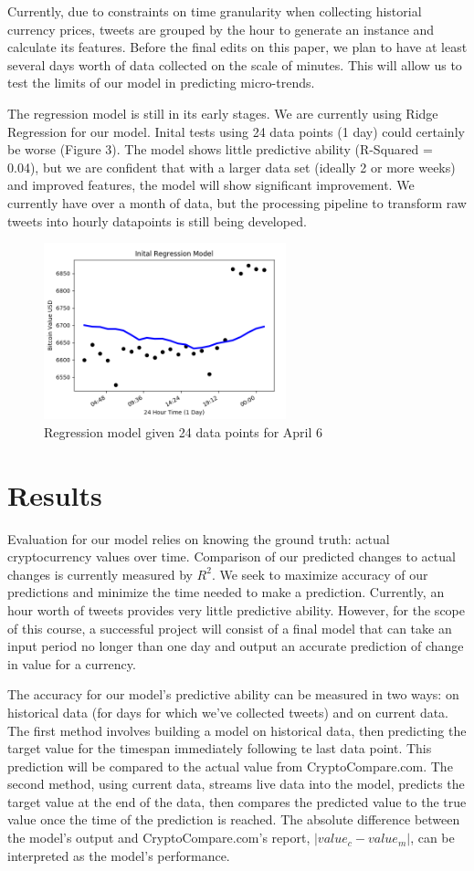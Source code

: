\documentclass[sigconf]{acmart}
\begin{document}
Currently, due to constraints on time granularity when collecting historial currency prices, tweets are grouped by the hour to generate an instance and calculate its features. Before the final edits on this paper, we plan to have at least several days worth of data collected on the scale of minutes. This will allow us to test the limits of our model in predicting micro-trends.

The regression model is still in its early stages. We are currently using Ridge Regression for our model. Inital tests using 24 data points (1 day) could certainly be worse (Figure 3). The model shows little predictive ability (R-Squared = 0.04), but we are confident that with a larger data set (ideally 2 or more weeks) and improved features, the model will show significant improvement. We currently have over a month of data, but the processing pipeline to transform raw tweets into hourly datapoints is still being developed.

\begin{figure}[H]
\caption{Regression model given 24 data points for April 6}
\includegraphics[width=7cm]{regression.png}
\end{figure}


\section{Results}
Evaluation for our model relies on knowing the ground truth: actual cryptocurrency values over time. Comparison of our predicted changes to actual changes is currently measured by $R^2$. We seek to maximize accuracy of our predictions and minimize the time needed to make a prediction. Currently, an hour worth of tweets provides very little predictive ability. However, for the scope of this course, a successful project will consist of a final model that can take an input period no longer than one day and output an accurate prediction of change in value for a currency.

The accuracy for our model's predictive ability can be measured in two ways: on historical data (for days for which we've collected tweets) and on current data. The first method involves building a model on historical data, then predicting the target value for the timespan immediately following te last data point. This prediction will be compared to the actual value from CryptoCompare.com. The second method, using current data, streams live data into the model, predicts the target value at the end of the data, then compares the predicted value to the true value once the time of the prediction is reached. The absolute difference between the model's output and CryptoCompare.com's report, $|value_c - value_m|$, can be interpreted as the model's performance.
\end{document}
